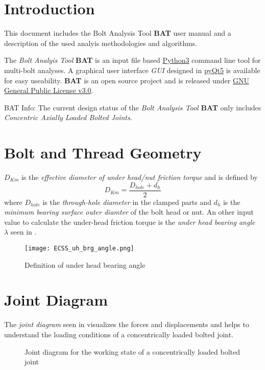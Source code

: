 \chapter{Introduction}
This document includes the Bolt Analysis Tool \textbf{BAT} user manual and a description of the 
used analyis methodologies and algorithms. 

The \emph{Bolt Analyis Tool} \textbf{BAT} is an input file based \href{https://www.python.org}{Python3}
command line tool for multi-bolt analyses. A graphical user interface \emph{GUI} designed in 
\href{https://pypi.org/project/PyQt5/}{pyQt5} is available for easy useability. 
\textbf{BAT} is an open source project and is released 
under \href{https://www.gnu.org/licenses/gpl-3.0.txt}{GNU General Public License v3.0}. 
\begin{colbox}{BAT Info:}
  The current design status of the \emph{Bolt Analysis Tool} \textbf{BAT} only includes 
  \emph{Concentric Axially Loaded Bolted Joints}. 
\end{colbox}

\chapter{Bolt and Thread Geometry}
$D_{Km}$ is the \emph{effective diameter of under head/nut friction torque} and is defined by 
\begin{equation}
  D_{Km} = \frac{D_{hole}+d_h}{2}
  \label{equ:dkm}
\end{equation}
where $D_{hole}$ is the \emph{through-hole diameter} in the clamped parts and $d_h$ is the 
\emph{minimum bearing surface outer diamter} of the bolt head or nut. An other input value to calculate
the under-head friction torque  is the \emph{under head bearing angle} $\lambda$ seen in 
.
\begin{figure}[!htpb]
  \centering
  \texttt{[image: ECSS\_uh\_brg\_angle.png]}
  \caption{Definition of under head bearing angle \cite{ECSS_HB_32_23A}}
  \label{fig:ecss_uh_brg_angle}
\end{figure}

\chapter{Joint Diagram}
\label{ch:jointdiag}
The \emph{joint diagram} seen in  \cite{VDI2230_1} visualizes the forces and 
displacements and helps to understand the loading conditions of a concentrically loaded bolted joint. 
\begin{figure}[!htbp]
  \centering
  \caption{Joint diagram for the working state of a concentrically loaded bolted joint}
\end{figure}

